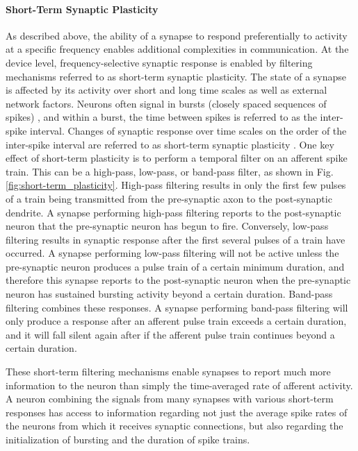 \paragraph{\label{sec:short_term_plasticity}Short-Term Synaptic Plasticity}
As described above, the ability of a synapse to respond preferentially to activity at a specific frequency enables additional complexities in communication. At the device level, frequency-selective synaptic response is enabled by filtering mechanisms referred to as short-term synaptic plasticity. 
The state of a synapse is affected by its activity over short and long time scales as well as external network factors. Neurons often signal in bursts (closely spaced sequences of spikes) \cite{iz2007}, and within a burst, the time between spikes is referred to as the inter-spike interval. Changes of synaptic response over time scales on the order of the inter-spike interval are referred to as short-term synaptic plasticity \cite{abre2004}. One key effect of short-term plasticity is to perform a temporal filter on an afferent spike train. This can be a high-pass, low-pass, or band-pass filter, as shown in Fig.\,\ref{fig:short-term_plasticity}. High-pass filtering results in only the first few pulses of a train being transmitted from the pre-synaptic axon to the post-synaptic dendrite. A synapse performing high-pass filtering reports to the post-synaptic neuron that the pre-synaptic neuron has begun to fire. Conversely, low-pass filtering results in synaptic response after the first several pulses of a train have occurred. A synapse performing low-pass filtering will not be active unless the pre-synaptic neuron produces a pulse train of a certain minimum duration, and therefore this synapse reports to the post-synaptic neuron when the pre-synaptic neuron has sustained bursting activity beyond a certain duration. Band-pass filtering combines these responses. A synapse performing band-pass filtering will only produce a response after an afferent pulse train exceeds a certain duration, and it will fall silent again after if the afferent pulse train continues beyond a certain duration.

These short-term filtering mechanisms enable synapses to report much more information to the neuron than simply the time-averaged rate of afferent activity. A neuron combining the signals from many synapses with various short-term responses has access to information regarding not just the average spike rates of the neurons from which it receives synaptic connections, but also regarding the initialization of bursting and the duration of spike trains.


